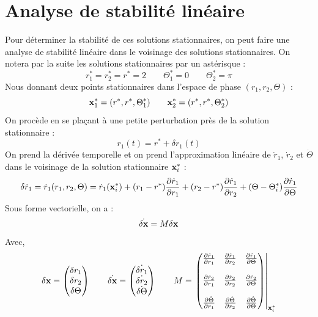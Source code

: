 \section{Analyse de stabilité linéaire}
%
%
Pour déterminer la stabilité de ces solutions stationnaires, on peut faire une analyse de stabilité linéaire dans le voisinage des solutions stationnaires. On notera par la suite les solutions stationnaires par un astérisque :
%
\begin{equation*}
    r_1^* = r_2^* = r^* = 2
    \qquad
    \Theta_1^* = 0
    \qquad
    \Theta_2^* = \pi
\end{equation*}
%
Nous donnant deux points stationnaires dans l'espace de phase $(r_1, r_2, \Theta)$ :
%
\begin{equation}
    \vb{x}_1^* = (r^*, r^*, \Theta_1^*)
    \qquad
    \vb{x}_2^* = (r^*, r^*, \Theta_2^*)
\end{equation}
%
On procède en se plaçant à une petite perturbation près de la solution stationnaire :
%
\begin{equation}
    r_1(t) = r^* + \delta r_1(t)
\end{equation}
%
On prend la dérivée temporelle et on prend l'approximation linéaire de $\dot{r}_1$, $\dot{r}_2$ et $\dot{\Theta}$ dans le voisinage de la solution stationnaire $\vb{x}^*_i$ :
%
\begin{dmath}
    \delta \dot{r}_1 = \dot{r}_1(r_1, r_2, \Theta)
    = \dot{r}_1(\vb{x}_i^*) 
    + (r_1 - r^*)\pdv{\dot{r}_1}{r_1} + (r_2 - r^*)\pdv{\dot{r}_1}{r_2} + (\Theta - \Theta_i^*)\pdv{\dot{r}_1}{\Theta}
\end{dmath}
%
Sous forme vectorielle, on a :
%
\begin{equation}
    \dot{\delta \vb{x}} = M \delta \vb{x}
\end{equation}
%
Avec,
%
\begin{equation}
    \delta \vb{x} = 
    \begin{pmatrix}
        \delta r_1 \\
        \delta r_2 \\
        \delta \Theta \\
    \end{pmatrix}
    \qquad
    \dot{\delta \vb{x}} =
    \begin{pmatrix}
        \dot{\delta r_1} \\
        \dot{\delta r_2} \\
        \dot{\delta \Theta}
    \end{pmatrix}
    \qquad
    M =
    \left. \begin{pmatrix}
        \pdv{\dot{r}_1}{r_1} & \pdv{\dot{r}_1}{r_2} & \pdv{\dot{r}_1}{\Theta} \\
        \\
        \pdv{\dot{r}_2}{r_1} & \pdv{\dot{r}_2}{r_2} & \pdv{\dot{r}_2}{\Theta} \\
        \\
        \pdv{\dot{\Theta}}{r_1} & \pdv{\dot{\Theta}}{r_2} & \pdv{\dot{\Theta}}{\Theta}
    \end{pmatrix}\right|_{\vb{x}_i^*}
    \label{eq:slow_flow}
\end{equation}
